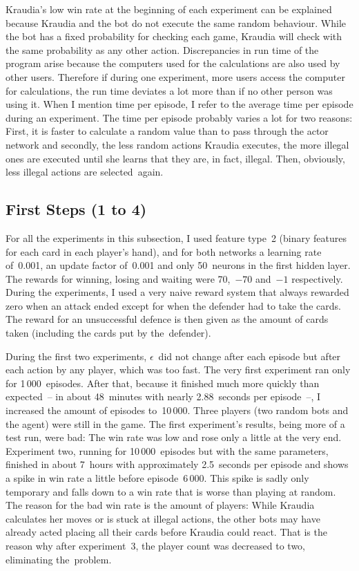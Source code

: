 \documentclass[a4paper,titlepage]{article}
\begin{document}
Kraudia's low win rate at the beginning of each experiment can be explained because Kraudia and the bot do not execute the same random behaviour. While the bot has a fixed probability for checking each game, Kraudia will check with the same probability as any other action. Discrepancies in run time of the program arise because the computers used for the calculations are also used by other users. Therefore if during one experiment, more users access the computer for calculations, the run time deviates a lot more than if no other person was using it. When I mention time per episode, I refer to the average time per episode during an experiment. The time per episode probably varies a lot for two reasons: First, it is faster to calculate a random value than to pass through the actor network and secondly, the less random actions Kraudia executes, the more illegal ones are executed until she learns that they are, in fact, illegal. Then, obviously, less illegal actions are selected~again.

\subsection{First Steps (1 to 4)}

For all the experiments in this subsection, I used feature type~2 (binary features for each card in each player's hand), and for both networks a learning rate of~0.001, an update factor of~0.001 and only 50~neurons in the first hidden layer. The rewards for winning, losing and waiting were 70,~$-70$ and~$-1$ respectively. During the experiments, I used a very naive reward system that always rewarded zero when an attack ended except for when the defender had to take the cards. The reward for an unsuccessful defence is then given as the amount of cards taken (including the cards put by the~defender).

During the first two experiments, $\epsilon$~did not change after each episode but after each action by any player, which was too fast.
The very first experiment ran only for 1\,000~episodes. After that, because it finished much more quickly than expected~-- in about 48~minutes with nearly 2.88~seconds per episode~--, I increased the amount of episodes to~10\,000.
Three players (two random bots and the agent) were still in the game. The first experiment's results, being more of a test run, were bad: The win rate was low and rose only a little at the very end. Experiment two, running for 10\,000~episodes but with the same parameters, finished in about 7~hours with approximately 2.5~seconds per episode and shows a spike in win rate a little before episode~6\,000. This spike is sadly only temporary and falls down to a win rate that is worse than playing at random. The reason for the bad win rate is the amount of players: While Kraudia calculates her moves or is stuck at illegal actions, the other bots may have already acted placing all their cards before Kraudia could react. That is the reason why after experiment~3, the player count was decreased to two, eliminating the~problem.
\end{document}
